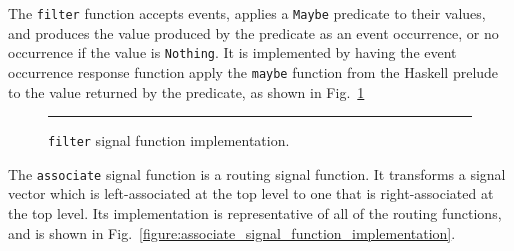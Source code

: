 \documentclass[draft]{llncs}
\begin{document}
The {\tt filter} function accepts events, applies a {\tt Maybe} predicate to
their values, and produces the value produced by the predicate as an event
occurrence, or no occurrence if the value is {\tt Nothing}. It is implemented
by having the event occurrence response function apply the {\tt maybe} function
from the Haskell prelude to the value returned by the predicate, as shown in 
Fig.~\ref{figure:filter_signal_function_implementation}

\begin{figure}[t]
\hrule
\caption{{\tt filter} signal function implementation.}
\label{figure:filter_signal_function_implementation}
\end{figure}

The {\tt associate} signal function is a routing signal function. It transforms
a signal vector which is left-associated at the top level to one that is
right-associated at the top level. Its implementation is representative of all
of the routing functions, and is shown in Fig.~\ref{figure:associate_signal_function_implementation}.
\end{document}
